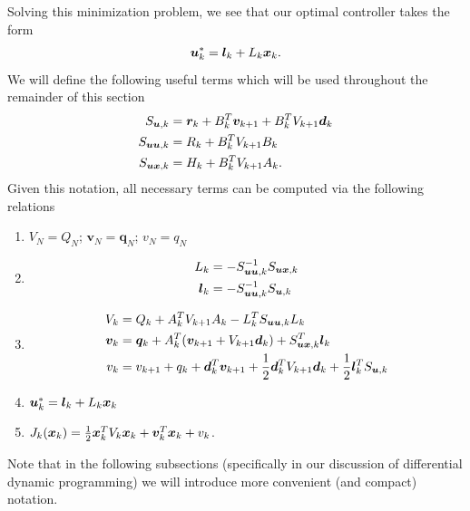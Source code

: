 Solving this minimization problem, we see that our optimal controller takes the form
\begin{equation}
    \bm{u}^*_{k} =\bm{l}_k +  L_{k} \bm{x}_{k}.
\end{equation}
We will define the following useful terms which will be used throughout the remainder of this section
\begin{align}
\label{eq:Qk_lqr}
    S_{\bm{u},k} &= \bm{r}_k + B_k^T \bm{v}_{k+1} + B_k^T V_{k+1} \bm{d}_k\\
    S_{\bm{u} \bm{u},k} &= R_k + B_k^T V_{k+1} B_k\\
    S_{\bm{u} \bm{x},k} &= H_k + B_k^T V_{k+1} A_k.
\end{align}
Given this notation, all necessary terms can be computed via the following relations
\begin{enumerate}
    \item $V_N = Q_N$; $\bm{v}_N = \bm{q}_N$; $v_N = q_N$
    \item \begin{align} L_k &= - S_{\bm{u} \bm{u},k}^{-1} S_{\bm{u} \bm{x},k}\\
    \bm{l}_k &= - S_{\bm{u} \bm{u},k}^{-1} S_{\bm{u},k}
    \end{align}
    \item 
    \begin{align}
        V_k &= Q_{k}  + A_k^T V_{k+1} A_k - L_k^T S_{\bm{u} \bm{u},k} L_k\\
        \bm{v}_k &= \bm{q}_k + A_k^T (\bm{v}_{k+1} + V_{k+1} \bm{d}_k) + S^T_{\bm{u} \bm{x},k} \bm{l}_k \\
        v_k &= v_{k+1} + q_k + \bm{d}_k^T \bm{v}_{k+1} + \frac{1}{2} \bm{d}_k^T V_{k+1} \bm{d}_k + \frac{1}{2} \bm{l}_k^T S_{\bm{u},k}
    \end{align}
    \item $\bm{u}^*_{k} =\bm{l}_k +  L_{k} \bm{x}_{k}$
    \item $J_k(\bm{x}_k) = \frac{1}{2}\bm{x}_k^T V_k \bm{x}_k + \bm{v}_k^T \bm{x}_k + v_k$.
\end{enumerate}
Note that in the following subsections (specifically in our discussion of differential dynamic programming) we will introduce more convenient (and compact) notation. 

